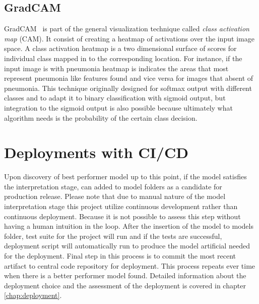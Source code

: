 \subsection{GradCAM}
GradCAM~\cite{heatmap} is part of the general visualization technique called \emph{class activation map} (CAM).
It consist of creating a heatmap of activations over the input image space.
A class activation heatmap is a two dimensional surface of scores for individual class mapped in to the corresponding location. For instance, if the input image is with pneumonia heatmap is indicates the areas that most represent pneumonia like features found and vice versa for images that absent of pneumonia.
This technique originally designed for softmax output with different classes and to adapt it to binary classification with sigmoid output, but integration to the sigmoid output is also possible because ultimately what algorithm needs is the probability of the certain class decision.

\section{Deployments with CI/CD}
Upon discovery of best performer model up to this point, if the model satisfies the interpretation stage, can added to model folders as a candidate for production release.
Please note that due to manual nature of the model interpretation stage this project utilize continuous development rather than continuous deployment.
Because it is not possible to assess this step without having a human intuition in the loop.
After the insertion of the model to models folder, test suite for the project will run and if the tests are successful, deployment script will automatically run to produce the model artificial needed for the deployment.
Final step in this process is to commit the most recent artifact to central code repository for deployment.
This process repeats ever time when there is a better performer model found.
Detailed information about the deployment choice and the assessment of the deployment is covered in chapter \ref{chap:deployment}.
